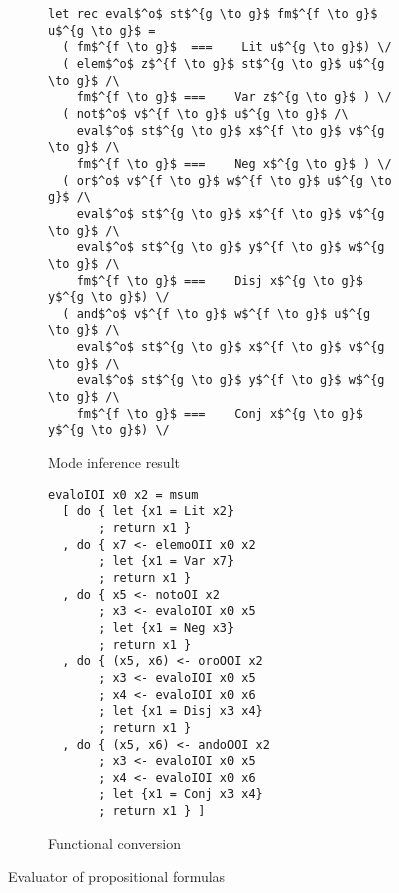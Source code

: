 \begin{figure*}[h]
  \centering
  \vspace{1.5mm}
  \begin{subfigure}[b]{0.45\textwidth}
    \begin{lstlisting}[frame=tb]
let rec eval$^o$ st$^{g \to g}$ fm$^{f \to g}$ u$^{g \to g}$ =
  ( fm$^{f \to g}$  ===    Lit u$^{g \to g}$) \/
  ( elem$^o$ z$^{f \to g}$ st$^{g \to g}$ u$^{g \to g}$ /\
    fm$^{f \to g}$ ===    Var z$^{g \to g}$ ) \/
  ( not$^o$ v$^{f \to g}$ u$^{g \to g}$ /\
    eval$^o$ st$^{g \to g}$ x$^{f \to g}$ v$^{g \to g}$ /\
    fm$^{f \to g}$ ===    Neg x$^{g \to g}$ ) \/
  ( or$^o$ v$^{f \to g}$ w$^{f \to g}$ u$^{g \to g}$ /\
    eval$^o$ st$^{g \to g}$ x$^{f \to g}$ v$^{g \to g}$ /\
    eval$^o$ st$^{g \to g}$ y$^{f \to g}$ w$^{g \to g}$ /\
    fm$^{f \to g}$ ===    Disj x$^{g \to g}$ y$^{g \to g}$) \/
  ( and$^o$ v$^{f \to g}$ w$^{f \to g}$ u$^{g \to g}$ /\
    eval$^o$ st$^{g \to g}$ x$^{f \to g}$ v$^{g \to g}$ /\
    eval$^o$ st$^{g \to g}$ y$^{f \to g}$ w$^{g \to g}$ /\
    fm$^{f \to g}$ ===    Conj x$^{g \to g}$ y$^{g \to g}$) \/
    \end{lstlisting}
    \caption{Mode inference result}
    \label{fig:prop_modded}
  \end{subfigure}
\hfill
  \begin{subfigure}[b]{0.45\textwidth}
    \begin{lstlisting}[frame=tb]
evaloIOI x0 x2 = msum
  [ do { let {x1 = Lit x2}
       ; return x1 }
  , do { x7 <- elemoOII x0 x2
       ; let {x1 = Var x7}
       ; return x1 }
  , do { x5 <- notoOI x2
       ; x3 <- evaloIOI x0 x5
       ; let {x1 = Neg x3}
       ; return x1 }
  , do { (x5, x6) <- oroOOI x2
       ; x3 <- evaloIOI x0 x5
       ; x4 <- evaloIOI x0 x6
       ; let {x1 = Disj x3 x4}
       ; return x1 }
  , do { (x5, x6) <- andoOOI x2
       ; x3 <- evaloIOI x0 x5
       ; x4 <- evaloIOI x0 x6
       ; let {x1 = Conj x3 x4}
       ; return x1 } ]
    \end{lstlisting}
    \caption{Functional conversion}
    \label{fig:prop_hsk}
  \end{subfigure}
  \caption{Evaluator of propositional formulas}
  \label{fig:prop}
\end{figure*}
